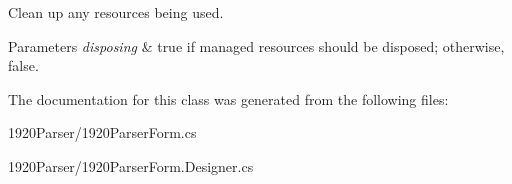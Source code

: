 Clean up any resources being used. 


\begin{DoxyParams}{Parameters}
{\em disposing} & true if managed resources should be disposed; otherwise, false.\\
\hline
\end{DoxyParams}


The documentation for this class was generated from the following files\+:\begin{DoxyCompactItemize}
\item 
1920\+Parser/1920\+Parser\+Form.\+cs\item 
1920\+Parser/1920\+Parser\+Form.\+Designer.\+cs\end{DoxyCompactItemize}
